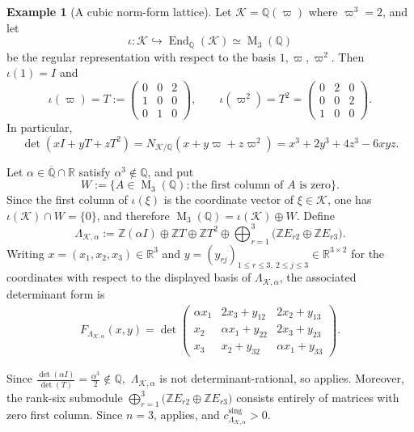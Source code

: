 \documentclass[reqno,11pt]{amsart}
\numberwithin{equation}{section}
\theoremstyle{definition}
\newtheorem{example}[theorem]{Example}
\theoremstyle{remark}
\newcommand{\op}{\operatorname}
\newcommand{\M}{\op{M}}
\begin{document}
\begin{example}[A cubic norm-form lattice]\label{ex:cubic-norm}
Let $\mathscr{K}=\mathbb Q(\varpi)$ where $\varpi^3=2$, and let
$$
\iota:\mathscr{K}\hookrightarrow\operatorname{End}_{\mathbb Q}(\mathscr{K})
\simeq\M_3(\mathbb Q)
$$
be the regular representation with respect to the basis
$1,\varpi,\varpi^2$. Then $\iota(1)=I$ and
$$
\iota(\varpi)=
T:=
\begin{pmatrix}
0&0&2\\
1&0&0\\
0&1&0
\end{pmatrix},
\qquad
\iota(\varpi^2)=T^2=
\begin{pmatrix}
0&2&0\\
0&0&2\\
1&0&0
\end{pmatrix}.
$$
In particular,
$$
\det(xI+yT+zT^2)
=N_{\mathscr{K}/\mathbb Q}(x+y\varpi+z\varpi^2)
=x^3+2y^3+4z^3-6xyz.
$$

Let $\alpha\in\overline{\mathbb Q}\cap\mathbb R$ satisfy
$\alpha^3\notin\mathbb Q$, and put
$$
W:=\{A\in\M_3(\mathbb Q):\text{the first column of }A\text{ is zero}\}.
$$
Since the first column of $\iota(\xi)$ is the coordinate vector of
$\xi\in \mathscr{K}$, one has $\iota(\mathscr{K})\cap W=\{0\}$, and therefore
$\M_3(\mathbb Q)=\iota(\mathscr{K})\oplus W$.
Define
$$
\Lambda_{\mathscr{K},\alpha}
:=
\mathbb Z(\alpha I)\oplus\mathbb ZT\oplus\mathbb ZT^2
\oplus
\bigoplus_{r=1}^3
\bigl(\mathbb ZE_{r2}\oplus\mathbb ZE_{r3}\bigr).
$$
Writing
$
x=(x_1,x_2,x_3)\in\mathbb R^3$ and
$y=(y_{rj})_{1\le r\le 3,\ 2\le j\le 3}\in\mathbb R^{3\times 2}$
for the coordinates with respect to the displayed basis of $\Lambda_{\mathscr{K},\alpha}$, the associated
determinant form is
\begin{align*}
F_{\Lambda_{\mathscr{K},\alpha}}(x,y) =
\det\!\begin{pmatrix}
\alpha x_1&2x_3+y_{12}&2x_2+y_{13}\\
x_2&\alpha x_1+y_{22}&2x_3+y_{23}\\
x_3&x_2+y_{32}&\alpha x_1+y_{33}
\end{pmatrix}.
\end{align*}


Since $\tfrac{\det(\alpha I)}{\det(T)}
=\tfrac{\alpha^3}{2}\notin\mathbb Q,$
$\Lambda_{\mathscr{K},\alpha}$ is not determinant-rational, so  applies. Moreover, the rank-six submodule
$\bigoplus_{r=1}^3\bigl(\mathbb ZE_{r2}\oplus\mathbb ZE_{r3}\bigr) $
consists entirely of matrices with zero first column. Since $n=3$,
 applies, and
$c_{\Lambda_{\mathscr{K},\alpha}}^{\operatorname{sing}}>0$.
\end{example}
\end{document}
